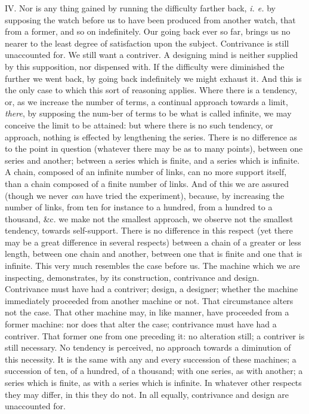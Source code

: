 IV. Nor is any thing gained by running the difficulty farther back,
\textit{i. e.} by supposing the watch before us to have been produced
from another watch, that from a former, and so on indefinitely. Our
going back ever so far, brings us no nearer to the least degree of
satisfaction upon the subject. Contrivance is still unaccounted for.
We still want a contriver. A designing mind is neither supplied by
this supposition, nor dispensed with. If the difficulty were
diminished the further we went back, by going back indefinitely we
might exhaust it. And this is the only case to which this sort of
reasoning applies. Where there is a tendency, or, as we increase the
number of terms, a continual approach towards a limit, \textit{there},
by supposing the num-ber of terms to be what is called
infinite, we may conceive the limit to be attained: but where there is
no such tendency, or approach, nothing is effected by lengthening the
series. There is no difference as to the point in question (whatever
there may be as to many points), between one series and another;
between a series which is finite, and a series which is infinite. A
chain, composed of an infinite number of links, can no more support
itself, than a chain composed of a finite number of links. And of this
we are assured (though we never \textit{can} have tried the
experiment), because, by increasing the number of links, from ten for
instance to a hundred, from a hundred to a thousand, \&c. we make not
the smallest approach, we observe not the smallest tendency, towards
self-support. There is no difference in this respect (yet there may be
a great difference in several respects) between a chain of a greater
or less length, between one chain and another, between one that is
finite and one that is infinite. This very much resembles the case
before us. The machine which we are inspecting, demonstrates, by its
construction, contrivance and design. Contrivance must have had a
contriver; design, a designer; whether the machine immediately
proceeded from another machine or  not. That circumstance
alters not the case. That other machine may, in like manner, have
proceeded from a former machine: nor does that alter the case;
contrivance must have had a contriver. That former one from one
preceding it: no alteration still; a contriver is still necessary. No
tendency is perceived, no approach towards a diminution of this
necessity. It is the same with any and every succession of these
machines; a succession of ten, of a hundred, of a thousand; with one
series, as with another; a series which is finite, as with a series
which is infinite. In whatever other respects they may differ, in this
they do not. In all equally, contrivance and design are unaccounted
for.

